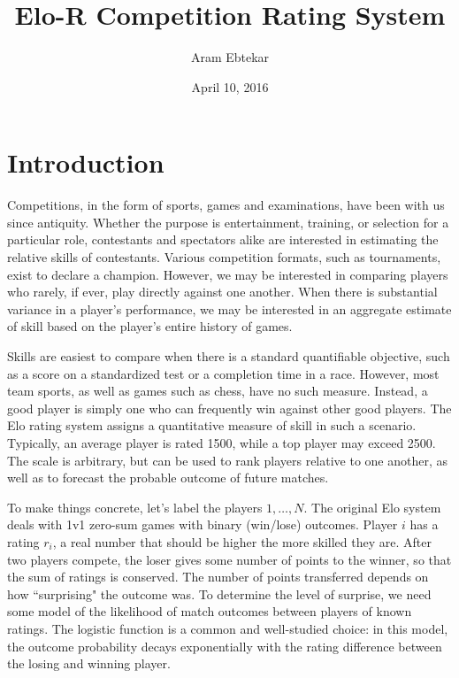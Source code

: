 \documentclass{article}
\title{Elo-R Competition Rating System}
\author{Aram Ebtekar}
\date{April 10, 2016}
\begin{document}
\maketitle

\section{Introduction}

Competitions, in the form of sports, games and examinations, have been with us since antiquity. Whether the purpose is entertainment, training, or selection for a particular role, contestants and spectators alike are interested in estimating the relative skills of contestants. Various competition formats, such as tournaments, exist to declare a champion. However, we may be interested in comparing players who rarely, if ever, play directly against one another. When there is substantial variance in a player's performance, we may be interested in an aggregate estimate of skill based on the player's entire history of games.

Skills are easiest to compare when there is a standard quantifiable objective, such as a score on a standardized test or a completion time in a race.  However, most team sports, as well as games such as chess, have no such measure. Instead, a good player is simply one who can frequently win against other good players. The Elo rating system assigns a quantitative measure of skill in such a scenario. Typically, an average player is  rated 1500, while a top player may exceed 2500. The scale is arbitrary, but can be used to rank players relative to one another, as well as to forecast the probable outcome of future matches.

To make things concrete, let's label the players $1,\ldots,N$. The original Elo system deals with 1v1 zero-sum games with binary (win/lose) outcomes. Player $i$ has a rating $r_i$, a real number that should be higher the more skilled they are. After two players compete, the loser gives some number of points to the winner, so that the sum of ratings is conserved. The number of points transferred depends on how ``surprising" the outcome was. To determine the level of surprise, we need some model of the likelihood of match outcomes between players of known ratings. The logistic function is a common and well-studied choice: in this model, the outcome probability decays exponentially with the rating difference between the losing and winning player.
\end{document}
